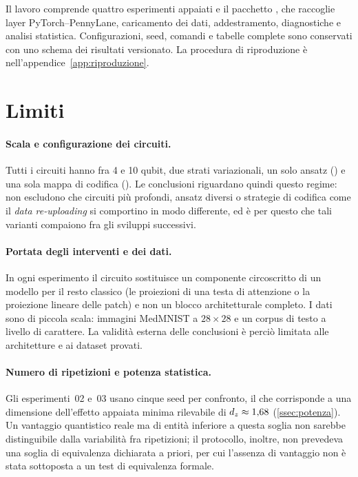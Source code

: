 Il lavoro comprende quattro esperimenti appaiati e il pacchetto
, che raccoglie layer PyTorch--PennyLane, caricamento dei
dati, addestramento, diagnostiche e analisi statistica. Configurazioni, seed,
comandi e tabelle complete sono conservati con uno schema dei risultati
versionato. La procedura di riproduzione è nell'appendice~\ref{app:riproduzione}.

\section{Limiti}
\label{sec:limiti}

\paragraph{Scala e configurazione dei circuiti.} Tutti i circuiti hanno fra 4 e
10 qubit, due strati variazionali, un solo ansatz ()
e una sola mappa di codifica (). Le conclusioni riguardano
quindi questo regime: non escludono che circuiti più profondi, ansatz diversi o
strategie di codifica come il \emph{data re-uploading} si comportino in modo
differente, ed è per questo che tali varianti compaiono fra gli sviluppi
successivi.

\paragraph{Portata degli interventi e dei dati.} In ogni esperimento il circuito
sostituisce un componente circoscritto di un modello per il resto classico (le
proiezioni di una testa di attenzione o la proiezione lineare delle patch) e
non un blocco architetturale completo. I dati sono di piccola scala: immagini
MedMNIST a $28\times28$ e un corpus di testo a livello di carattere. La validità
esterna delle conclusioni è perciò limitata alle architetture e ai dataset
provati.

\paragraph{Numero di ripetizioni e potenza statistica.} Gli esperimenti~02 e~03
usano cinque seed per confronto, il che corrisponde a una dimensione dell'effetto
appaiata minima rilevabile di $d_z \approx 1{,}68$ (\cref{ssec:potenza}). Un
vantaggio quantistico reale ma di entità inferiore a questa soglia non sarebbe
distinguibile dalla variabilità fra ripetizioni; il protocollo, inoltre, non
prevedeva una soglia di equivalenza dichiarata a priori, per cui l'assenza di
vantaggio non è stata sottoposta a un test di equivalenza formale.

